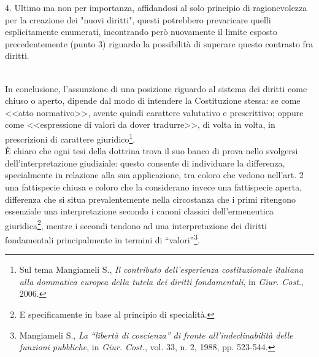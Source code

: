 4. Ultimo ma non per importanza, affidandosi al solo principio di ragionevolezza per la creazione dei "nuovi diritti", questi potrebbero prevaricare quelli esplicitamente enumerati, incontrando però nuovamente il limite esposto precedentemente (punto 3) riguardo la possibilità di superare questo contrasto fra diritti.
\begin{comment}Vicenda simile si è verificata nelle corti americane, che sebbene facenti parte di un sistema di common law che prevede l'utilizzo del precedente, ha avuto "problematiche" rispetto all'interpretazione del IX emendamento al pari di quello che nelle corti italiane si è avuto rispetto all'interpretazione dell'art. 2.
L'america si divise in due linee ermeneutiche ben distinte: la lettura ampia, che vedeva il IX emendamento come norma di produzione del diritto, e la lettura restrittiva, che considerava invece il IX emendamento come norma di interpretazione.
La prima consentiva il riconoscimento di un numero illimitato di diritti fondamentali, mentre la seconda si trovava ad essere più che altro una norma "istruzione", ossia su come leggere la costituzionale, consentendo quindi l'emersione sì di diritti impliciti nel dettato costituzionale stesso, ma limitati ad una riconducibilità diretta alla stessa.
Il fulcro sta anche in questo caso nel riconoscere il valore della certezza del diritto e la necessità di vagliaare sempre le scelte degli interpreti con i filtri apprestati dall'ordinamento nel riconoscimento di un nuovo diritto, ma bilanciandolo con l'esigenza di estendere il carattere <<fondamentale>> a nuovi interesse emergenti.\end{comment}
\\In conclusione, l’assunzione di una posizione riguardo al sistema dei diritti come chiuso o aperto, dipende dal modo di intendere la Costituzione stessa: se come <<atto normativo>>, avente quindi carattere valutativo e prescrittivo; oppure come <<espressione di valori da dover tradurre>>, di volta in volta, in prescrizioni di carattere giuridico\footnote{Sul tema Mangiameli S., \textit{Il contributo dell’esperienza costituzionale italiana alla dommatica europea della tutela dei diritti fondamentali}, in \textit{Giur. Cost.}, 2006.}.
\\È chiaro che ogni tesi della dottrina trova il suo banco di prova nello svolgersi dell’interpretazione giudiziale: questo consente di individuare la differenza, specialmente in relazione alla sua applicazione, tra coloro che vedono nell’art. 2 una fattispecie chiusa e coloro che la considerano invece una fattispecie aperta, differenza che si situa prevalentemente nella circostanza che i primi ritengono essenziale una interpretazione secondo i canoni classici dell’ermeneutica giuridica\footnote{E specificamente in base al principio di specialità.}, mentre i secondi tendono ad una interpretazione dei diritti fondamentali principalmente in termini di “valori”\footnote{Mangiameli S., \textit{La “libertà di coscienza” di fronte all’indeclinabilità delle funzioni pubbliche}, in \textit{Giur. Cost.}, vol. 33, n. 2, 1988, pp. 523-544.}.
